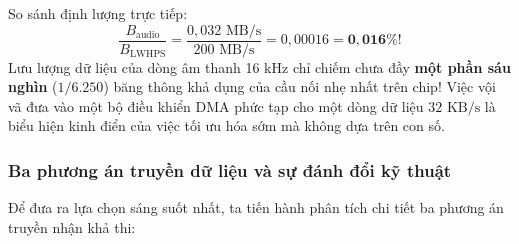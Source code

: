 So sánh định lượng trực tiếp:
\begin{equation}
\frac{B_{\text{audio}}}{B_{\text{LWHPS}}} = \frac{0{,}032\text{ MB/s}}{200\text{ MB/s}} = 0{,}00016 = \mathbf{0{,}016\%}!
\end{equation}
Lưu lượng dữ liệu của dòng âm thanh 16 kHz chỉ chiếm chưa đầy \textbf{một phần sáu nghìn} ($1/6.250$) băng thông khả dụng của cầu nối nhẹ nhất trên chip! Việc vội vã đưa vào một bộ điều khiển DMA phức tạp cho một dòng dữ liệu $32\text{ KB/s}$ là biểu hiện kinh điển của việc tối ưu hóa sớm mà không dựa trên con số.

\subsubsection*{Ba phương án truyền dữ liệu và sự đánh đổi kỹ thuật}
Để đưa ra lựa chọn sáng suốt nhất, ta tiến hành phân tích chi tiết ba phương án truyền nhận khả thi:

